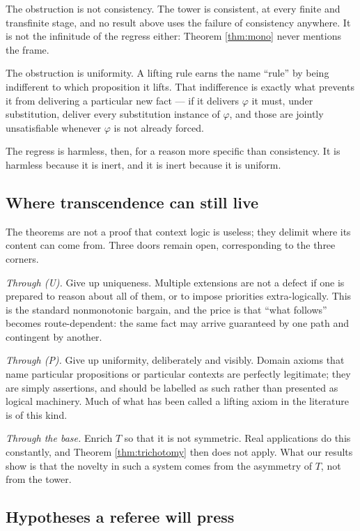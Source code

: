 \documentclass[11pt]{article}
\theoremstyle{plain}
\theoremstyle{definition}
\theoremstyle{remark}
\begin{document}
The obstruction is not consistency. The tower is consistent, at every finite and
transfinite stage, and no result above uses the failure of consistency anywhere.
It is not the infinitude of the regress either: Theorem \ref{thm:mono} never
mentions the frame.

The obstruction is uniformity. A lifting rule earns the name ``rule'' by being
indifferent to which proposition it lifts. That indifference is exactly what
prevents it from delivering a particular new fact --- if it delivers $\varphi$
it must, under substitution, deliver every substitution instance of $\varphi$,
and those are jointly unsatisfiable whenever $\varphi$ is not already forced.

The regress is harmless, then, for a reason more specific than consistency. It
is harmless because it is inert, and it is inert because it is uniform.

\subsection{Where transcendence can still live}

The theorems are not a proof that context logic is useless; they delimit where
its content can come from. Three doors remain open, corresponding to the three
corners.

\emph{Through (U).} Give up uniqueness. Multiple extensions are not a defect if
one is prepared to reason about all of them, or to impose priorities
extra-logically. This is the standard nonmonotonic bargain, and the price is
that ``what follows'' becomes route-dependent: the same fact may arrive
guaranteed by one path and contingent by another.

\emph{Through (P).} Give up uniformity, deliberately and visibly. Domain axioms
that name particular propositions or particular contexts are perfectly
legitimate; they are simply assertions, and should be labelled as such rather
than presented as logical machinery. Much of what has been called a lifting
axiom in the literature is of this kind.

\emph{Through the base.} Enrich $T$ so that it is not symmetric. Real
applications do this constantly, and Theorem \ref{thm:trichotomy} then does not
apply. What our results show is that the novelty in such a system comes from the
asymmetry of $T$, not from the tower.

\subsection{Hypotheses a referee will press}
\end{document}
